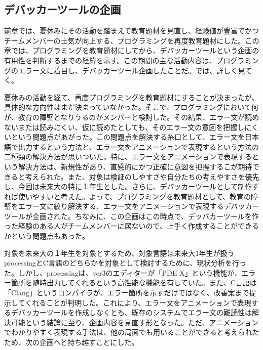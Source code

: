 \documentclass[openany,11pt,papersize]{jsbook}
\begin{document}
\subsection{デバッカーツールの企画}
\par 前章では、夏休みにその活動を踏まえて教育題材を見直し、経験値が豊富でかつチームメンバーの士気が向上する、プログラミングを再度教育題材にした。この章では、プログラミングを教育題材にしてから、デバッカーツールという企画の有用性を判断するまでの経緯を示す。この期間の主な活動内容は、プログラミングのエラー文に着目し、デバッカーツール企画したことだ。では、詳しく見てく。
\par 夏休みの活動を経て、再度プログラミングを教育題材にすることが決まったが、具体的な方向性はまだ決まっていなかった。そこで、プログラミングにおいて何が、教育の障壁となりうるのかメンバーと検討した。その結果、エラー文が読めないまたは読みにくい、仮に読めたとしても、そのエラー文の意図を把握しにくいという問題点があがった。この問題点を解決する糸口として、エラー文を日本語で出力するという方法と、エラー文をアニメーションで表現するという方法の二種類の解決方法が思いついた。特に、エラー文をアニメーションで表現するという解決方法は、新規性があり、直感的にかつ正確に意図を把握するこが期待できると考えられた。また、対象は検証のしやすさや自分たちの考えやすさを優先し、今回は未来大の特に１年生とした。さらに、デバッカーツールとして制作すれば使いやすいと考えた。よって、プログラミングを教育題材として、教育の障壁をエラー文に絞り解決する、エラー文をアニメーションで表現するデバッカーツールが企画された。ちなみに、この企画はこの時点で、デッバカーツールを作った経験のある人がチームメンバーに居ないので、上手く作成することができるかという問題点もあった。
\par 対象を未来大の１年生を対象とするため、対象言語は未来大1年生が扱うprocessingとC言語のどちらかを対象として検討するために、現状分析を行った。しかし、processingは、ver3のエディターが「PDE X」という機能が、エラー箇所を随時出力してくれるという高性能な機能を有していた。また、C言語は「Clang」というコンパイラが、エラー箇所を示すだけではなく、改善案まで提示してくれることが判明した。これにより、エラー文をアニメーションで表現するデバッカーツールを作成しなくとも、既存のシステムでエラー文の難読性は解決可能という結論に至り、企画内容を見直す形となった。ただ、アニメーションでわかりやすく表現する手法は、他の局面でも用いることができると考えられたため、次の企画へと持ち越すことにした。

\end{document}

